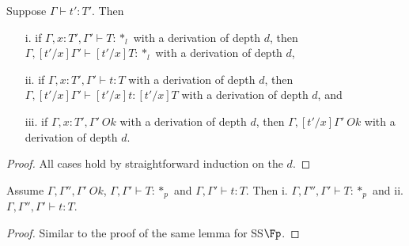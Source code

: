 \begin{lemma}
  \label{lemma:term_substitution_for_kinding_context_ok_ssfe}
  Suppose $\Gamma \vdash t':T'$.  Then
  \begin{itemize}
  \item[i.] if $\Gamma,x:T',\Gamma' \vdash T:*_l$ with a
    derivation of depth $d$, then $\Gamma,[t'/x]\Gamma' \vdash
    [t'/x]T:*_l$ with a derivation of depth $d$,
  \item[ii.] if $\Gamma, x:T',\Gamma' \vdash t:T$ with a 
    derivation of depth $d$, then $\Gamma,[t'/x]\Gamma' \vdash [t'/x]t:[t'/x]T$ 
    with a derivation of depth $d$, and
  \item[iii.] if $\Gamma,x:T',\Gamma'\ Ok$ with a derivation of depth $d$, then 
    $\Gamma,[t'/x]\Gamma'\ Ok$ with a derivation of depth $d$.
  \end{itemize}
\end{lemma}
\begin{proof}
  All cases hold by straightforward induction on the $d$.
\end{proof}

\begin{lemma}
  \label{lemma:context_weakening_for_kinding_and_typing_ssfe}
  Assume $\Gamma,\Gamma'',\Gamma'\ Ok$, $\Gamma,\Gamma' \vdash T:*_p$ and 
  $\Gamma,\Gamma' \vdash t:T$.  Then i. $\Gamma,\Gamma'',\Gamma' \vdash T:*_p$ and
  ii. $\Gamma,\Gamma'',\Gamma' \vdash t:T$. 
\end{lemma}
\begin{proof}
  Similar to the proof of the same lemma for SS$\Fp$.
\end{proof}

